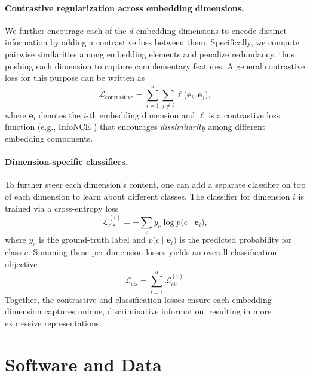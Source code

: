 \paragraph{Contrastive regularization across embedding dimensions.}
We further encourage each of the \(d\) embedding dimensions to encode distinct information by adding a contrastive loss between them. Specifically, we compute pairwise similarities among embedding elements and penalize redundancy, thus pushing each dimension to capture complementary features. A general contrastive loss for this purpose can be written as
\begin{equation}
\mathcal{L}_{\text{contrastive}} = \sum_{i=1}^{d} \sum_{j \neq i} \ell\bigl(\mathbf{e}_i, \mathbf{e}_j\bigr),
\label{eq:contrastive}
\end{equation}
where \(\mathbf{e}_i\) denotes the \(i\)-th embedding dimension and \(\ell\) is a contrastive loss function (e.g., InfoNCE \citep{oordRepresentationLearningContrastive2019}) that encourages \emph{dissimilarity} among different embedding components.

\paragraph{Dimension-specific classifiers.}
To further steer each dimension's content, one can add a separate classifier on top of each dimension to learn about different classes. The classifier for dimension \(i\) is trained via a cross-entropy loss
\begin{equation}
\mathcal{L}_{\text{cls}}^{(i)} = - \sum_{c} y_{c} \log p\bigl(c \mid \mathbf{e}_i\bigr),
\label{eq:cls_loss_i}
\end{equation}
where \(y_c\) is the ground-truth label and \(p\bigl(c \mid \mathbf{e}_i\bigr)\) is the predicted probability for class \(c\). Summing these per-dimension losses yields an overall classification objective
\begin{equation}
\mathcal{L}_{\text{cls}} = \sum_{i=1}^{d} \mathcal{L}_{\text{cls}}^{(i)}.
\label{eq:cls_loss_total}
\end{equation}
Together, the contrastive and classification losses ensure each embedding dimension captures unique, discriminative information, resulting in more expressive representations.


\section*{Software and Data}

